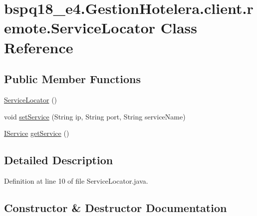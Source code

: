 \hypertarget{classbspq18__e4_1_1_gestion_hotelera_1_1client_1_1remote_1_1_service_locator}{}\section{bspq18\+\_\+e4.\+Gestion\+Hotelera.\+client.\+remote.\+Service\+Locator Class Reference}
\label{classbspq18__e4_1_1_gestion_hotelera_1_1client_1_1remote_1_1_service_locator}
\subsection*{Public Member Functions}
\begin{DoxyCompactItemize}
\item 
\mbox{\hyperlink{classbspq18__e4_1_1_gestion_hotelera_1_1client_1_1remote_1_1_service_locator_ad2f50f1b9b565a12acdd75a2dcd446c2}{Service\+Locator}} ()
\item 
void \mbox{\hyperlink{classbspq18__e4_1_1_gestion_hotelera_1_1client_1_1remote_1_1_service_locator_aaa1214ed3091ee0383463749dcdbbd28}{set\+Service}} (String ip, String port, String service\+Name)
\item 
\mbox{\hyperlink{interfacebspq18__e4_1_1_gestion_hotelera_1_1server_1_1remote_1_1_i_service}{I\+Service}} \mbox{\hyperlink{classbspq18__e4_1_1_gestion_hotelera_1_1client_1_1remote_1_1_service_locator_ad4d87e31d4e1f8252621d096efb171fa}{get\+Service}} ()
\end{DoxyCompactItemize}


\subsection{Detailed Description}


Definition at line 10 of file Service\+Locator.\+java.



\subsection{Constructor \& Destructor Documentation}
\mbox{\label{classbspq18__e4_1_1_gestion_hotelera_1_1client_1_1remote_1_1_service_locator_ad2f50f1b9b565a12acdd75a2dcd446c2}} 
